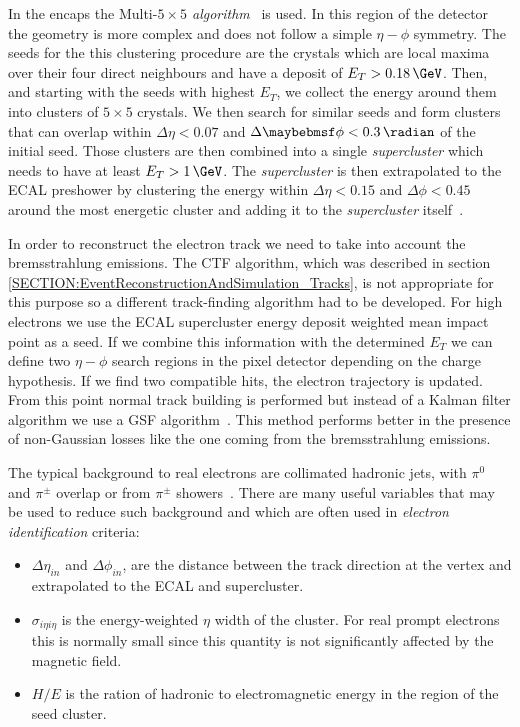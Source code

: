 In the encaps the \textit{$\text{Multi-}5 \times 5$ algorithm}~\cite{ARTICLE:CMSElectronReconstruction8TeV} is used. In this region of the detector the geometry is more complex and does not follow a simple $\eta-\phi$ symmetry. The seeds for the this clustering procedure are the crystals which are local maxima over their four direct neighbours and have a deposit of $E_T>0.18\,\GeV$. Then, and starting with the seeds with highest $E_T$, we collect the energy around them into clusters of $5 \times 5$ crystals. We then search for similar seeds and form clusters that can overlap within $\Delta\eta<0.07$ and $\Delta\phi<0.3\,\radian$ of the initial seed. Those clusters are then combined into a single \textit{supercluster} which needs to have at least $E_T>1\,\GeV$. The \textit{supercluster} is then extrapolated to the \gls{ECAL} preshower by clustering the energy within $\Delta\eta<0.15$ and $\Delta\phi<0.45$ around the most energetic cluster and adding it to the \textit{supercluster} itself~\cite{ARTICLE:CMSElectronReconstruction8TeV}.

In order to reconstruct the electron track we need to take into account the bremsstrahlung emissions. The \gls{CTF} algorithm, which was described in section \ref{SECTION:EventReconstructionAndSimulation_Tracks}, is not appropriate for this purpose so a different track-finding algorithm had to be developed. For high \pt electrons we use the \gls{ECAL} supercluster energy deposit weighted mean impact point as a seed. If we combine this information with the determined $E_T$ we can define two $\eta-\phi$ search regions in the pixel detector depending on the charge hypothesis. If we find two compatible hits, the electron trajectory is updated. From this point normal track building is performed but instead of a Kalman filter algorithm we use a \gls{GSF} algorithm~\cite{ARTICLE:CMSReconstructionElectronsGSF}. This method performs better in the presence of non-Gaussian losses like the one coming from the bremsstrahlung emissions.

The typical background to real electrons are collimated hadronic jets, with $\pi^0$ and $\pi^{\pm}$ overlap or from $\pi^{\pm}$ showers~\cite{ARTICLE:CMSElectronReconstruction}. There are many useful variables that may be used to reduce such background and which are often used in \textit{electron identification} criteria:

\begin{itemize}
  \item $\Delta\eta_{in}$ and $\Delta\phi_{in}$, are the distance between the track direction at the vertex and extrapolated to the \gls{ECAL} and supercluster.
  \item $\sigma_{i \eta i \eta}$ is the energy-weighted $\eta$ width of the cluster. For real prompt electrons this is normally small since this quantity is not significantly affected by the magnetic field.
  \item $H/E$ is the ration of hadronic to electromagnetic energy in the region of the seed cluster. 
\end{itemize}

